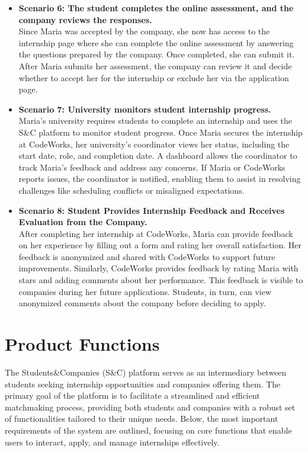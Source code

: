 \begin{itemize}
    \item \textbf{Scenario 6: The student completes the online assessment, and the company reviews the responses.} \\
    Since Maria was accepted by the company, she now has access to the internship page where she can complete the online assessment by answering the questions prepared by the company. Once completed, she can submit it. After Maria submits her assessment, the company can review it and decide whether to accept her for the internship or exclude her via the application page.

    \item \textbf{Scenario 7: University monitors student internship progress.} \\
    Maria’s university requires students to complete an internship and uses the S\&C platform to monitor student progress. Once Maria secures the internship at CodeWorks, her university’s coordinator views her status, including the start date, role, and completion date. A dashboard allows the coordinator to track Maria’s feedback and address any concerns. If Maria or CodeWorks reports issues, the coordinator is notified, enabling them to assist in resolving challenges like scheduling conflicts or misaligned expectations.

    \item \textbf{Scenario 8: Student Provides Internship Feedback and Receives Evaluation from the Company.}  \\
    After completing her internship at CodeWorks, Maria can provide feedback on her experience by filling out a form and rating her overall satisfaction. Her feedback is anonymized and shared with CodeWorks to support future improvements.
    Similarly, CodeWorks provides feedback by rating Maria with stars and adding comments about her performance. This feedback is visible to companies during her future applications. Students, in turn, can view anonymized comments about the company before deciding to apply.
    \end{itemize}

\newpage

\section{Product Functions}

The Students\&Companies (S\&C) platform serves as an intermediary between students seeking internship opportunities and companies offering them. The primary goal of the platform is to facilitate a streamlined and efficient matchmaking process, providing both students and companies with a robust set of functionalities tailored to their unique needs. Below, the most important requirements of the system are outlined, focusing on core functions that enable users to interact, apply, and manage internships effectively.

